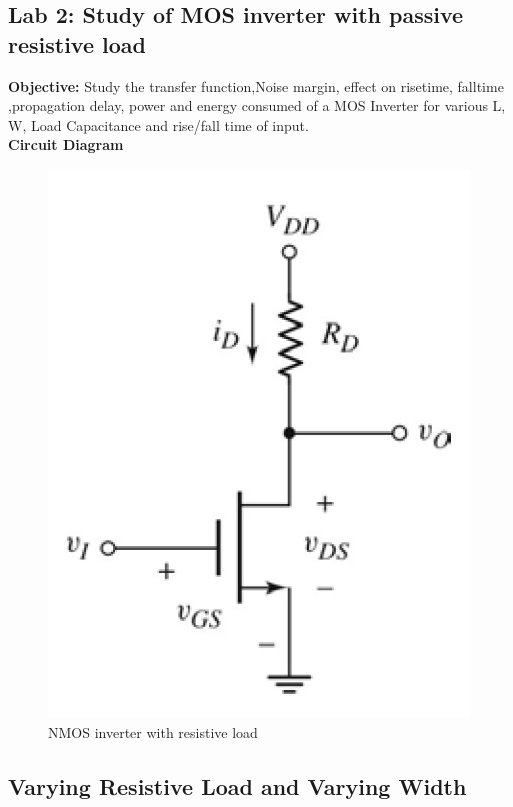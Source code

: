 \documentclass[12pt,a4paper]{article}
\begin{document}
\clearpage
\begin{center}


\section{Lab 2: Study of MOS inverter with passive resistive load}
\bigskip

{\bf{Objective:}} 
Study the transfer function,Noise margin, effect on risetime, falltime ,propagation
delay, power and energy consumed of a MOS Inverter for various L, W, Load Capacitance and rise/fall time of input.\\ \vspace{2pt}
{\bf{Circuit Diagram}}
\vspace{2pt}

\begin{figure}[!ht]
\centering
\includegraphics[scale=0.37]{nmos_inverter_with_resistive_load.jpg}
\caption[Short]{NMOS inverter with resistive load}
\end{figure}

\subsection{Varying Resistive Load and Varying Width}
\begin{lstlisting}
 

\end{lstlisting}
\end{center}
\end{document}
